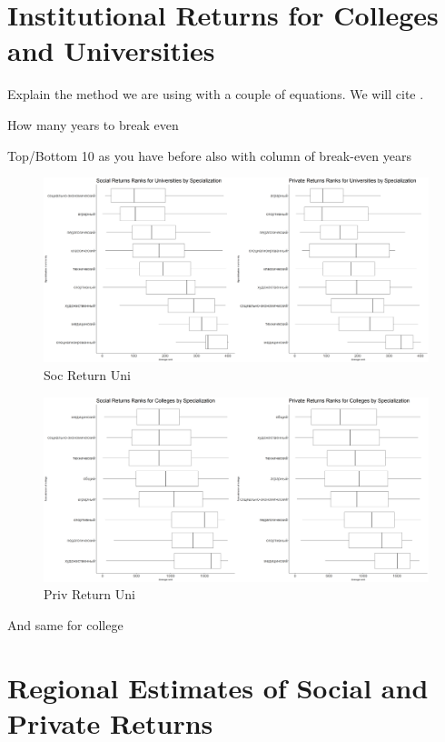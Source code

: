 \documentclass[alpha-refs]{wiley-article-05g}
\begin{document}
\newpage

\section{Institutional Returns for Colleges and Universities}

Explain the method we are using with a couple of equations. We will cite \cite{Psacharopoulos_1995}.

How many years to break even

Top/Bottom 10 as you have before also with column of break-even years

\begin{figure}[htbp!]
	\centering
	\includegraphics[width=400pt]{socret_uni.png}
	\caption{Soc Return Uni}\label{fig:2.1}
\end{figure}


\begin{figure}[htbp!]
	\centering
	\includegraphics[width=400pt]{socret_col.png}
	\caption{Priv Return Uni}\label{fig:2.2}
\end{figure}

And same for college

\lipsum[2]

\lipsum[3]

\section{Regional Estimates of Social and Private Returns}
\end{document}
